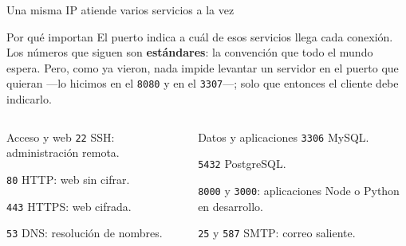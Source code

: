 \documentclass[aspectratio=169,10pt,c]{beamer}
\begin{document}
\begin{frame}{Una misma IP atiende varios servicios a la vez}
\begin{block}{Por qué importan}
\small El puerto indica a cuál de esos servicios llega cada conexión. Los números que siguen son \textbf{estándares}: la convención que todo el mundo espera. Pero, como ya vieron, nada impide levantar un servidor en el puerto que quieran —lo hicimos en el \texttt{8080} y en el \texttt{3307}—; solo que entonces el cliente debe indicarlo.
\end{block}
\begin{columns}[T,onlytextwidth]
\begin{exampleblock}{Acceso y web}
\small
\texttt{22} SSH: administración remota.\par\smallskip
\texttt{80} HTTP: web sin cifrar.\par\smallskip
\texttt{443} HTTPS: web cifrada.\par\smallskip
\texttt{53} DNS: resolución de nombres.
\end{exampleblock}
\begin{exampleblock}{Datos y aplicaciones}
\small
\texttt{3306} MySQL.\par\smallskip
\texttt{5432} PostgreSQL.\par\smallskip
\texttt{8000} y \texttt{3000}: aplicaciones Node o Python en desarrollo.\par\smallskip
\texttt{25} y \texttt{587} SMTP: correo saliente.
\end{exampleblock}
\end{columns}
\end{frame}
\end{document}
